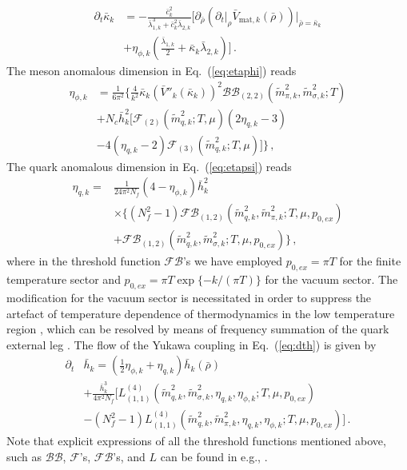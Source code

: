 \documentclass[%
reprint,
superscriptaddress,
showpacs,preprintnumbers,
amsmath,amssymb,
aps,
prd,
]{revtex4-1}
\def\Eq#1{Eq.~(\ref{#1})}
\begin{document}
%
\begin{align}
\partial_t \bar \kappa_k&=-\frac{\bar c_k^2}{\bar{\lambda}_{1,k}^3+\bar c_k^2\bar{\lambda}_{2,k}}\bigg[\partial_{\bar \rho}\left(\partial_t\big|_{\rho} \bar V_{\mathrm{mat}, k}(\bar \rho)\right)\Big|_{\bar \rho=\bar \kappa_k}\nonumber \\[2ex]
&+\eta_{\phi,k}\left(\frac{\bar{\lambda}_{1,k}}{2}+\bar\kappa_k\bar{\lambda}_{2,k}\right)\bigg]\,.\label{eq:flowkappa}
\end{align}
%
The meson anomalous dimension in \Eq{eq:etaphi} reads
%
\begin{align}
\eta_{\phi,k}&=\frac{1}{6\pi^2}\Bigg\{\frac{4}{k^2} \bar{\kappa}_k(\bar{V}''_k(\bar{\kappa}_k))^2\mathcal{BB}_{(2,2)}(\tilde{m}^{2}_{\pi,k},\tilde{m}^{2}_{\sigma,k};T)\nonumber\\[2ex]
&+N_c\bar{h}^{2}_{k}\bigg[\mathcal{F}_{(2)}(\tilde{m}^{2}_{q,k};T,\mu)(2\eta_{q,k}-3)\nonumber\\[2ex]
&-4(\eta_{q,k}-2)\mathcal{F}_{(3)}(\tilde{m}^2_{q,k};T,\mu)\bigg]\Bigg\}\,, \label{eq:etaphi2}  
\end{align} 
%
The quark anomalous dimension in \Eq{eq:etapsi} reads
%
\begin{align}
\eta_{q,k}=&\frac{1}{24\pi^2N_f}(4-\eta_{\phi,k})\bar{h}^{2}_{k}\nonumber\\[2ex]
&\times\bigg\{ (N^{2}_{f}-1)\mathcal{FB}_{(1,2)}(\tilde{m}^{2}_{q,k},\tilde{m}^{2}_{\pi,k};T,\mu,p_{0,ex})\nonumber\\[2ex]
&+\mathcal{FB}_{(1,2)}(\tilde{m}^{2}_{q,k},\tilde{m}^{2}_{\sigma,k};T,\mu,p_{0,ex})\bigg\}\,, \label{eq:etapsi2}
\end{align} 
%
where in the threshold function $\mathcal{FB}$'s we have employed $p_{0,ex}=\pi T$ for the finite temperature sector and $p_{0,ex}=\pi T\exp\{-k/(\pi T)\}$ for the vacuum sector. The modification for the vacuum sector is necessitated in order to suppress the artefact of temperature dependence of thermodynamics in the low temperature region \cite{Fu:2015naa}, which can be resolved by means of frequency summation of the quark external leg \cite{Fu:2016tey}. The flow of the Yukawa coupling in \Eq{eq:dth} is given by
%
\begin{align}
\partial_t&\bar{h}_k=\left(\frac{1}{2}\eta_{\phi,k}+\eta_{q,k}\right)\bar{h}_k(\bar{\rho})\nonumber\\[2ex]
&+\frac{\bar{h}^3_k}{4\pi^2N_f}\bigg[L^{(4)}_{(1,1)}(\tilde{m}^{2}_{q,k},\tilde{m}^{2}_{\sigma,k},\eta_{q,k},\eta_{\phi,k};T,\mu,p_{0,ex})\nonumber\\[2ex]
&-(N^{2}_{f}-1)L^{(4)}_{(1,1)}(\tilde{m}^{2}_{q,k},\tilde{m}^{2}_{\pi,k},\eta_{q,k},\eta_{\phi,k};T,\mu,p_{0,ex})\bigg]\,.\label{eq:dth2}  
\end{align} 
%
Note that explicit expressions of all the threshold functions mentioned above, such as $\mathcal{BB}$, $\mathcal{F}$'s, $\mathcal{FB}$'s, and $L$ can be found in e.g., \cite{Fu:2019hdw,Yin:2019ebz}.
	
\end{document}
